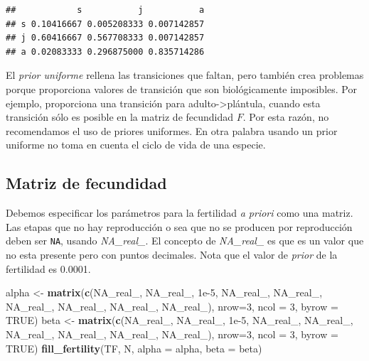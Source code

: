 \documentclass[
]{book}
\newenvironment{Shaded}{\begin{snugshade}}{\end{snugshade}}
\newcommand{\AttributeTok}[1]{\textcolor[rgb]{0.13,0.29,0.53}{#1}}
\newcommand{\ConstantTok}[1]{\textcolor[rgb]{0.56,0.35,0.01}{#1}}
\newcommand{\DecValTok}[1]{\textcolor[rgb]{0.00,0.00,0.81}{#1}}
\newcommand{\FloatTok}[1]{\textcolor[rgb]{0.00,0.00,0.81}{#1}}
\newcommand{\FunctionTok}[1]{\textcolor[rgb]{0.13,0.29,0.53}{\textbf{#1}}}
\newcommand{\NormalTok}[1]{#1}
\newcommand{\OtherTok}[1]{\textcolor[rgb]{0.56,0.35,0.01}{#1}}
\theoremstyle{definition}
\theoremstyle{definition}
\theoremstyle{definition}
\theoremstyle{definition}
\theoremstyle{remark}
\begin{document}
\begin{verbatim}
##            s           j           a
## s 0.10416667 0.005208333 0.007142857
## j 0.60416667 0.567708333 0.007142857
## a 0.02083333 0.296875000 0.835714286
\end{verbatim}

El \emph{prior uniforme} rellena las transiciones que faltan, pero también
crea problemas porque proporciona valores de transición que son
biológicamente imposibles. Por ejemplo, proporciona una transición para
adulto-\textgreater plántula, cuando esta transición sólo es posible en la matriz
de fecundidad \(F\). Por esta razón, no recomendamos el uso de priores
uniformes. En otra palabra usando un prior uniforme no toma en cuenta el
ciclo de vida de una especie.

\subsection{Matriz de fecundidad}\label{matriz-de-fecundidad}

Debemos especificar los parámetros para la fertilidad \emph{a priori} como
una matriz. Las etapas que no hay reproducción o sea que no se producen
por reproducción deben ser \texttt{NA}, usando \emph{NA\_real\_}. El concepto de
\emph{NA\_real\_} es que es un valor que no esta presente pero con puntos
decimales. Nota que el valor de \emph{prior} de la fertilidad es 0.0001.

\begin{Shaded}
\begin{Highlighting}[]
\NormalTok{alpha }\OtherTok{\textless{}{-}} \FunctionTok{matrix}\NormalTok{(}\FunctionTok{c}\NormalTok{(}\ConstantTok{NA\_real\_}\NormalTok{, }\ConstantTok{NA\_real\_}\NormalTok{, }\FloatTok{1e{-}5}\NormalTok{,}
                  \ConstantTok{NA\_real\_}\NormalTok{, }\ConstantTok{NA\_real\_}\NormalTok{, }\ConstantTok{NA\_real\_}\NormalTok{,}
                  \ConstantTok{NA\_real\_}\NormalTok{, }\ConstantTok{NA\_real\_}\NormalTok{, }\ConstantTok{NA\_real\_}\NormalTok{), }\AttributeTok{nrow=}\DecValTok{3}\NormalTok{, }\AttributeTok{ncol =} \DecValTok{3}\NormalTok{, }\AttributeTok{byrow =} \ConstantTok{TRUE}\NormalTok{)}
\NormalTok{beta }\OtherTok{\textless{}{-}} \FunctionTok{matrix}\NormalTok{(}\FunctionTok{c}\NormalTok{(}\ConstantTok{NA\_real\_}\NormalTok{, }\ConstantTok{NA\_real\_}\NormalTok{, }\FloatTok{1e{-}5}\NormalTok{,}
                  \ConstantTok{NA\_real\_}\NormalTok{, }\ConstantTok{NA\_real\_}\NormalTok{, }\ConstantTok{NA\_real\_}\NormalTok{,}
                  \ConstantTok{NA\_real\_}\NormalTok{, }\ConstantTok{NA\_real\_}\NormalTok{, }\ConstantTok{NA\_real\_}\NormalTok{), }\AttributeTok{nrow=}\DecValTok{3}\NormalTok{, }\AttributeTok{ncol =} \DecValTok{3}\NormalTok{, }\AttributeTok{byrow =} \ConstantTok{TRUE}\NormalTok{)}
\FunctionTok{fill\_fertility}\NormalTok{(TF, N, }\AttributeTok{alpha =}\NormalTok{ alpha, }\AttributeTok{beta =}\NormalTok{ beta)}
\end{Highlighting}
\end{Shaded}
\end{document}
